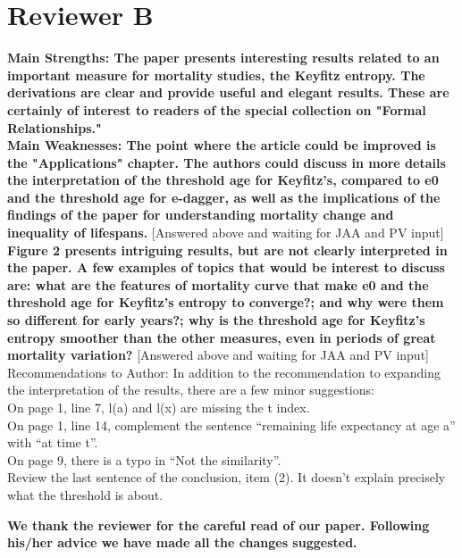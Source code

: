 \documentclass[a4paper,twoside, openright, 12pt, leqno]{article}
\begin{document}
\section*{Reviewer B}
\textbf{Main Strengths:
The paper presents interesting results related to an important measure for mortality studies, the Keyfitz entropy. The derivations are clear and provide useful and elegant results. These are certainly of interest to readers of the special collection on "Formal Relationships."}\\

\textbf{Main Weaknesses:
The point where the article could be improved is the "Applications" chapter. The authors could discuss in more details the interpretation of the threshold age for Keyfitz's, compared to e0 and the threshold age for e-dagger, as well as the implications of the findings of the paper for understanding mortality change and inequality of lifespans.} [Answered above and waiting for JAA and PV input]\\

\textbf{Figure 2 presents intriguing results, but are not clearly interpreted in the paper. A few examples of topics that would be interest to discuss are: what are the features of mortality curve that make e0 and the threshold age for Keyfitz's entropy to converge?; and why were them so different for early years?; why is the threshold age for Keyfitz's entropy smoother than the other measures, even in periods of great mortality variation?} [Answered above and waiting for JAA and PV input]\\

Recommendations to Author:
In addition to the recommendation to expanding the interpretation of the results, there are a few minor suggestions:\\
On page 1, line 7, l(a) and l(x) are missing the t index.\\
On page 1, line 14, complement the sentence “remaining life expectancy at age a” with “at time t”.\\
On page 9, there is a typo in “Not the similarity”. \\
Review the last sentence of the conclusion, item (2). It doesn’t explain precisely what the threshold is about.

\textbf{We thank the reviewer for the careful read of our paper. Following his/her advice we have made all the changes suggested.}



\end{document}
